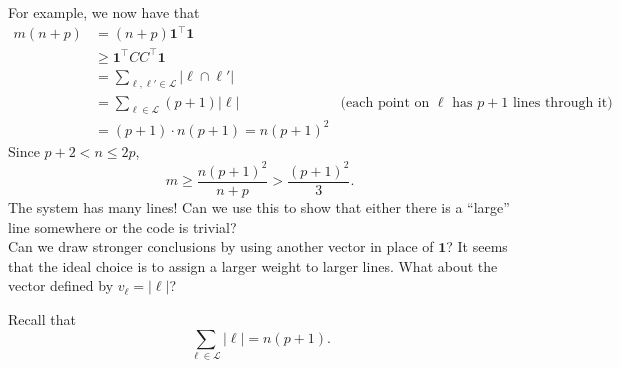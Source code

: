\documentclass{article}
\begin{document}
	For example, we now have that
	\begin{align*}
		m(n+p) &= (n+p)\textbf{1}^\top \textbf{1} \\
			&\ge \textbf{1}^\top CC^\top \textbf{1} \\
			&= \sum_{\ell,\ell' \in \mathcal{L}} |\ell \cap \ell'| \\
			&= \sum_{\ell \in \mathcal{L}} (p+1)|\ell| & \text{(each point on $\ell$ has $p+1$ lines through it)} \\ 
			&= (p+1) \cdot n(p+1) = n(p+1)^2
	\end{align*}
	Since $p+2 < n \le 2p$,
	\[ m \ge \frac{n(p+1)^2}{n+p} > \frac{(p+1)^2}{3}. \]
	The system has many lines! Can we use this to show that either there is a ``large'' line somewhere or the code is trivial?\\
	Can we draw stronger conclusions by using another vector in place of $\textbf{1}$? It seems that the ideal choice is to assign a larger weight to larger lines. What about the vector defined by $v_{\ell} = |\ell|$?

	Recall that
	\[ \sum_{\ell \in \mathcal{L}} |\ell| = n(p+1). \]
\end{document}

